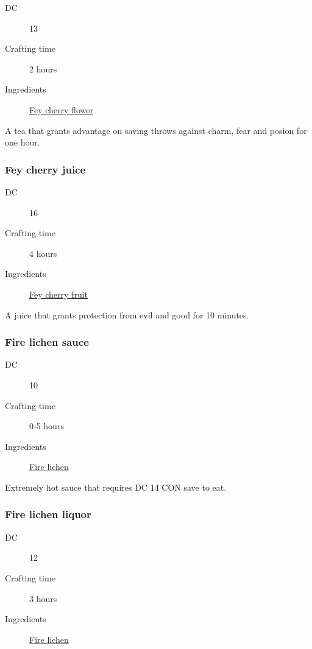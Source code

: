 \begin{description}
\item [DC] 13
\item [Crafting time] 2 hours
\item [Ingredients] \hyperref[Fey cherry]{Fey cherry flower}
\end{description}

A tea that grants advantage on saving throws against charm, fear and posion for one hour. 

\subsubsection{Fey cherry juice}
\label{Fey cherry juice}

\begin{description}
\item [DC] 16
\item [Crafting time] 4 hours
\item [Ingredients] \hyperref[Fey cherry]{Fey cherry fruit}
\end{description}

A juice that grants protection from evil and good for 10 minutes.

\subsubsection{Fire lichen sauce}
\label{Fire lichen sauce}

\begin{description}
\item [DC] 10
\item [Crafting time] 0-5 hours
\item [Ingredients] \hyperref[Fire lichen]{Fire lichen}
\end{description}

Extremely hot sauce that requires DC 14 CON save to eat.

\subsubsection{Fire lichen liquor}
\label{Fire lichen liquor}

\begin{description}
\item [DC] 12
\item [Crafting time] 3 hours
\item [Ingredients] \hyperref[Fire lichen]{Fire lichen}
\end{description}

